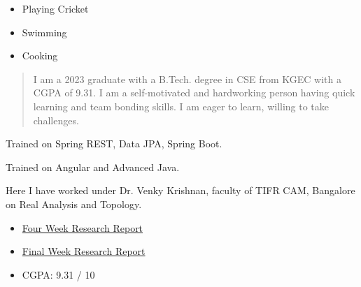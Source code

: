 \documentclass[10pt,legalpaper,ragged2e,withhyper]{altacv}
\newenvironment{sloppypar*}{\sloppy\ignorespaces}{\par}
\begin{document}
\begin{paracol}{2}
    \begin{sloppypar*}
        \begin{itemize}
            \item Playing Cricket
            \item Swimming
            \item Cooking
        \end{itemize}
    \end{sloppypar*}

    \newpage
    \switchcolumn

    \begin{quote}
        
            I am a 2023 graduate with a B.Tech. degree in CSE from KGEC with a CGPA of 9.31. I am a self-motivated and hardworking person having quick learning and team bonding skills. I am eager to learn, willing to take challenges.
        
    \end{quote}

    Trained on Spring REST, Data JPA, Spring Boot.
    \divider

    Trained on Angular and Advanced Java.
    \divider

    Here I have worked under Dr. Venky Krishnan, faculty of TIFR CAM, Bangalore on Real Analysis and Topology. \\
    \begin{itemize}
        \item \href{https://www.academia.edu/94639467/Four_Week_Research_Report_of_IASC_INSA_NASI_Summer_Research_Fellowship?source=swp_share}{Four Week Research Report}
        \item \href{https://www.academia.edu/94640080/Final_Week_Research_Report_of_IASC_INSA_NASI_Summer_Research_Fellowship?source=swp_share}{Final Week Research Report}
    \end{itemize}

    \begin{itemize}
        \item CGPA: 9.31 / 10
    \end{itemize}


\end{paracol}
\end{document}
